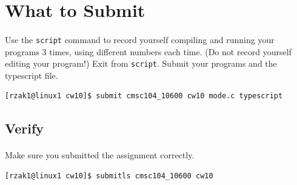 \documentclass[letter,11pt]{article}
\begin{document}
\section*{What to Submit}
\paragraph{}Use the \texttt{script} command to record yourself compiling and running your programs 3 times, using different numbers each time. (Do not record yourself editing your program!) Exit from \texttt{script}. Submit your programs and the typescript file.

\begin{verbatim}
[rzak1@linux1 cw10]$ submit cmsc104_10600 cw10 mode.c typescript
\end{verbatim}

\subsection*{Verify}
\paragraph{}Make sure you submitted the assignment correctly.
\begin{verbatim}
[rzak1@linux1 cw10]$ submitls cmsc104_10600 cw10
\end{verbatim}
\end{document}
